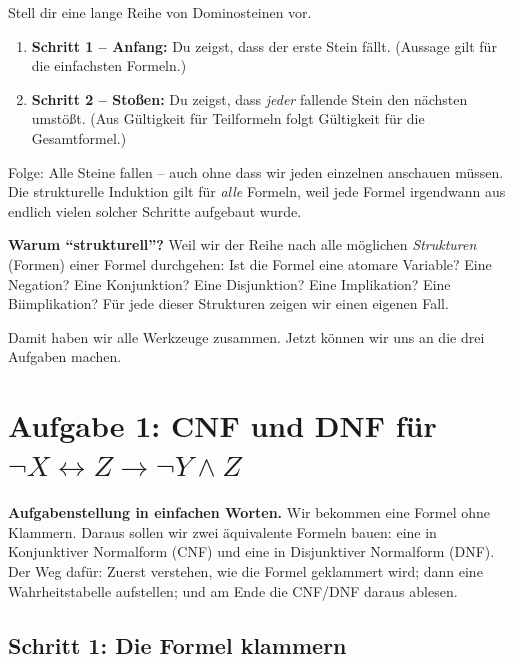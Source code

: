 \documentclass[a4paper,12pt]{article}
\begin{document}
\begin{analogie}[title={Analogie: Dominosteine}]
Stell dir eine lange Reihe von Dominosteinen vor.
\begin{enumerate}[nosep]
\item \textbf{Schritt 1 -- Anfang:} Du zeigst, dass der erste Stein
      f\"allt. (Aussage gilt f\"ur die einfachsten Formeln.)
\item \textbf{Schritt 2 -- Sto{\ss}en:} Du zeigst, dass \emph{jeder}
      fallende Stein den n\"achsten umst\"o{\ss}t. (Aus G\"ultigkeit
      f\"ur Teilformeln folgt G\"ultigkeit f\"ur die Gesamtformel.)
\end{enumerate}
Folge: Alle Steine fallen -- auch ohne dass wir jeden einzelnen
anschauen m\"ussen. Die strukturelle Induktion gilt f\"ur \emph{alle}
Formeln, weil jede Formel irgendwann aus endlich vielen solcher
Schritte aufgebaut wurde.
\end{analogie}

\textbf{Warum "`strukturell"'?} Weil wir der Reihe nach alle
m\"oglichen \emph{Strukturen} (Formen) einer Formel durchgehen: Ist
die Formel eine atomare Variable? Eine Negation? Eine Konjunktion?
Eine Disjunktion? Eine Implikation? Eine Biimplikation? F\"ur jede
dieser Strukturen zeigen wir einen eigenen Fall.

\bigskip
Damit haben wir alle Werkzeuge zusammen. Jetzt k\"onnen wir uns an
die drei Aufgaben machen.

\newpage


\section*{Aufgabe 1: CNF und DNF f\"ur $\neg X \leftrightarrow Z \to \neg Y \wedge Z$}

\textbf{Aufgabenstellung in einfachen Worten.} Wir bekommen eine
Formel ohne Klammern. Daraus sollen wir zwei \"aquivalente Formeln
bauen: eine in Konjunktiver Normalform (CNF) und eine in Disjunktiver
Normalform (DNF). Der Weg daf\"ur: Zuerst verstehen, wie die Formel
geklammert wird; dann eine Wahrheitstabelle aufstellen; und am Ende
die CNF/DNF daraus ablesen.

\subsection*{Schritt 1: Die Formel klammern}
\end{document}
